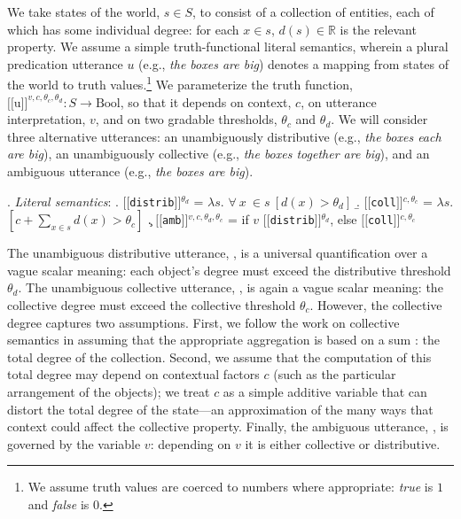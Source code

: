 \documentclass[preprint,12pt,authoryear,titlepage]{elsarticle}
\newcommand{\sem}[1]{\mbox{$[\![$#1$]\!]$}}
\newcommand{\lam}{$\lambda$}
\begin{document}
We take states of the world, $s\in S$, to consist of a collection of entities, each of which has some individual degree: for each $x\in s$, $d(s)\in \mathbb R$ is the relevant property.
We assume a simple truth-functional literal semantics, wherein a plural predication utterance $u$ (e.g., \emph{the boxes are big})  denotes a mapping from states of the world to truth values.\footnote{We assume truth values are coerced to numbers where appropriate: \emph{true} is $1$ and \emph{false} is $0$.} We parameterize the truth function, $\sem{u}^{v,c,\theta_c,\theta_d}: S \rightarrow \text{Bool}$, so that it depends on context, $c$, on utterance interpretation, $v$, and on two gradable thresholds, $\theta_c$ and $\theta_d$. 
We will consider three alternative utterances: 
an {unambiguously distributive} (e.g., \emph{the boxes each are big}), an {unambiguously collective} (e.g., \emph{the boxes together are big}), and an {ambiguous} utterance (e.g., \emph{the boxes are big}).

\ex. \emph{Literal semantics}:
\a. \label{dist}\sem{\texttt{distrib}}$^{\theta_d}$ = 
\lam $s$. $\forall \ x\ \in s\ [d(x) > \theta_d]$
\b. \label{coll}\sem{\texttt{coll}}$^{c,\theta_c}$ = 
\lam $s$. $[c + \sum_{x\in s} d(x) > \theta_c]$
\c.  \label{amb}\sem{\texttt{amb}}$^{v, c, \theta_d, \theta_c}$ = 
if $v$ \sem{\texttt{distrib}}$^{\theta_d}$, else \sem{\texttt{coll}}$^{c,\theta_c}$

The unambiguous distributive utterance, \Last[a], is a universal quantification over a vague scalar meaning: each object's degree must exceed the distributive threshold $\theta_d$. 
The unambiguous collective utterance, \Last[b], is again a vague scalar meaning: the collective degree must exceed the collective threshold $\theta_c$. 
However, the collective degree captures two assumptions. First, we follow the work on collective semantics in assuming that the appropriate aggregation is based on a sum \citep[e.g.][]{scha1984}: the total degree of the collection.
Second, we assume that the computation of this total degree may depend on contextual factors $c$ (such as the particular arrangement of the objects); we treat $c$ as a simple additive variable that can distort the total degree of the state---an approximation of the many ways that context could affect the collective property. 
Finally, the ambiguous utterance, \Last[c], is governed by the variable $v$: depending on $v$ it is either collective or distributive.
\end{document}
